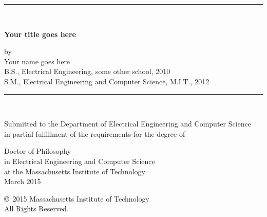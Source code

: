 

\thispagestyle{empty}

\begin{centering}
\rule{\textwidth}{.05in}\\ \vspace{.10in}

\Large \textbf{\textsf{ Your title goes here
}} \\
\normalsize

\vspace{.1in}
by \\

\vspace{.1in}
Your name goes here \\

\vspace{.1in} B.S., Electrical Engineering,
some other school, 2010 \\

\vspace{.0in} S.M., Electrical Engineering and Computer Science,
M.I.T., 2012 \\

\vspace{.1in}
\rule{\textwidth}{.05in}\\

\vspace{.2in}

Submitted to the Department of Electrical Engineering and Computer Science \\
in partial fulfillment of the requirements for the degree of \\

\vspace{.15in}

Doctor of Philosophy \\ %
in Electrical Engineering and Computer Science \\
at the Massachusetts Institute of Technology \\

\vspace{.1in} March 2015

\vspace{.15in} \copyright\ 2015
Massachusetts Institute of Technology \\
All Rights Reserved. \\

\end{centering}

